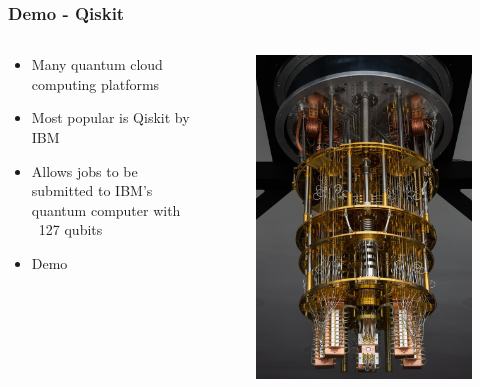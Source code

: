 \documentclass[aspectratio=169]{beamer}
\begin{document}
            

\begin{frame}
    \frametitle{Demo - Qiskit}
    \begin{columns}
        \begin{column}{0.5\textwidth}
            \begin{itemize}
                \item Many quantum cloud computing platforms
                \item Most popular is Qiskit by IBM
                \item Allows jobs to be submitted to IBM's quantum computer with ~127 qubits
                \item Demo
            \end{itemize}
        \end{column}
        \begin{column}{0.5\textwidth}
            \begin{figure}[placement]
                \centering
                \includegraphics[height=0.66\textheight]{images/quantum_computer.jpg}

\end{figure}
\end{column}
\end{columns}
\end{frame}
\end{document}
